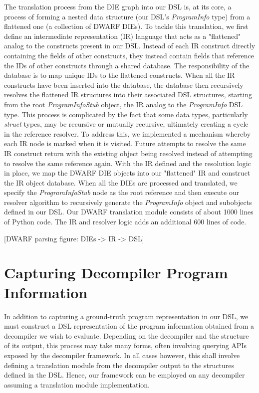 The translation process from the DIE graph into our DSL is, at its core, a process of forming a nested data structure (our DSL's \emph{ProgramInfo} type) from a flattened one (a collection of DWARF DIEs). To tackle this translation, we first define an intermediate representation (IR) language that acts as a "flattened" analog to the constructs present in our DSL. Instead of each IR construct directly containing the fields of other constructs, they instead contain fields that reference the IDs of other constructs through a shared database. The responsibility of the database is to map unique IDs to the flattened constructs. When all the IR constructs have been inserted into the database, the database then recursively resolves the flattened IR structures into their associated DSL structures, starting from the root \emph{ProgramInfoStub} object, the IR analog to the \emph{ProgramInfo} DSL type. This process is complicated by the fact that some data types, particularly \emph{struct} types, may be recursive or mutually recursive, ultimately creating a cycle in the reference resolver. To address this, we implemented a mechanism whereby each IR node is marked when it is visited. Future attempts to resolve the same IR construct return with the existing object being resolved instead of attempting to resolve the same reference again. With the IR defined and the resolution logic in place, we map the DWARF DIE objects into our "flattened" IR and construct the IR object database. When all the DIEs are processed and translated, we specify the \emph{ProgramInfoStub} node as the root reference and then execute our resolver algorithm to recursively generate the \emph{ProgramInfo} object and subobjects defined in our DSL. Our DWARF translation module consists of about 1000 lines of Python code. The IR and resolver logic adds an additional 600 lines of code.

[DWARF parsing figure: DIEs -> IR -> DSL]

\section{Capturing Decompiler Program Information}

In addition to capturing a ground-truth program representation in our DSL, we must construct a DSL representation of the program information obtained from a decompiler we wish to evaluate. Depending on the decompiler and the structure of its output, this process may take many forms, often involving querying APIs exposed by the decompiler framework. In all cases however, this shall involve defining a translation module from the decompiler output to the structures defined in the DSL. Hence, our framework can be employed on any decompiler assuming a translation module implementation.

